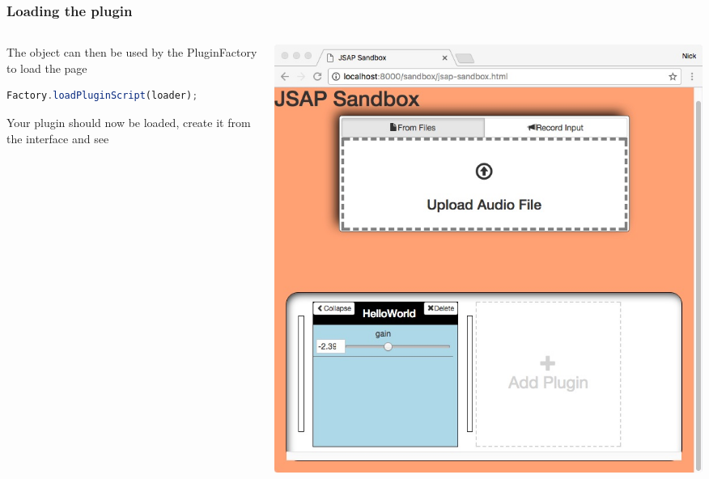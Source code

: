 \documentclass{beamer}
\begin{document}
\begin{frame}[fragile]
\frametitle{Loading the plugin}
\begin{columns}
\begin{column}{0.5\textwidth}
The object can then be used by the PluginFactory to load the page
\begin{lstlisting}[language=javascript]
Factory.loadPluginScript(loader);
\end{lstlisting}
Your plugin should now be loaded, create it from the interface and see
\end{column}

\begin{column}{0.5\textwidth}
\includegraphics[width=\columnwidth]{final.jpg}
\end{column}
\end{columns}
\end{frame}
\end{document}

